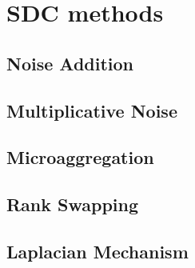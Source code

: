 \section{SDC methods}
\label{Theory::SDCMethods}

\subsection{Noise Addition}
\label{Theory::SDCMethods::NoiseAddition}

\subsection{Multiplicative Noise}
\label{Theory::SDCMethods::MultiplicativeNoise}

\subsection{Microaggregation}
\label{Theory::SDCMethods::Microaggregation}

\subsection{Rank Swapping}
\label{Theory::SDCMethods::RankSwapping}

\subsection{Laplacian Mechanism}
\label{Theory::SDCMethods::LaplacianMechanism}
